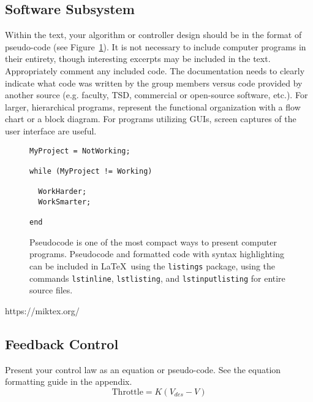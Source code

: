 \documentclass{wrcecapstone}
\begin{document}
\subsection{Software Subsystem}
Within the text, your algorithm or controller design should be in the format of pseudo-code (see Figure~\ref{f3}). It is not necessary to include computer programs in their entirety, though interesting excerpts may be included in the text. Appropriately comment any included code. The documentation needs to clearly indicate what code was written by the group members versus code provided by another source (e.g. faculty, TSD, commercial or open-source software, etc.).  For larger, hierarchical programs, represent the functional organization with a flow chart or a block diagram.  For programs utilizing GUIs, screen captures of the user interface are useful.   
\begin{figure}
\begin{lstlisting}
MyProject = NotWorking; 

while (MyProject != Working)

  WorkHarder;
  WorkSmarter;

end
\end{lstlisting}
\caption{Pseudocode is one of the most compact ways to present computer programs. Pseudocode and formatted code with syntax highlighting can be included in \LaTeX\ using the \lstinline{listings} package, using the commands \lstinline{lstinline}, \lstinline{lstlisting}, and \lstinline{lstinputlisting} for entire source files.}
\label{f3}
\end{figure}
  https://miktex.org/
\subsection{Feedback Control}
Present your control law as an equation or pseudo-code.   See the equation formatting guide in the appendix.  
\begin{equation}
\mbox{Throttle} = K (V_{des} - V)
\end{equation}
\end{document}
